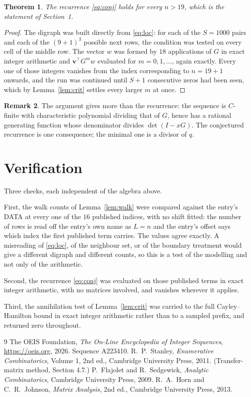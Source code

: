 \documentclass[11pt,a4paper]{article}
\theoremstyle{plain}
\newtheorem{theorem}{Theorem}
\theoremstyle{definition}
\newtheorem{remark}[theorem]{Remark}
\begin{document}
\begin{theorem}
The recurrence \eqref{eq:conj} holds for every $n>19$, which is the statement of
Section~1.
\end{theorem}

\begin{proof}
The digraph was built directly from \eqref{eq:loc}: for each of the $S=1000$ pairs and each
of the $(9+1)^{3}$ possible next rows, the condition was tested on every cell of
the middle row. The vector $w$ was formed by $18$ applications of $G$ in exact integer
arithmetic and $\mathbf{v}^{\!\top}G^{m}w$ evaluated for $m=0,1,\dots$, again exactly.
Every one of those integers vanishes from the index corresponding to $n=19+1$ onwards,
and the run was continued until $S+1$ consecutive zeros had been seen, which by
Lemma~\ref{lem:crit} settles every larger $m$ at once.
\end{proof}

\begin{remark}
The argument gives more than the recurrence: the sequence is $C$-finite with characteristic
polynomial dividing that of $G$, hence has a rational generating function whose denominator
divides $\det(I-xG)$. The conjectured recurrence is one consequence; the minimal one is a
divisor of $q$.
\end{remark}

\section{Verification}

Three checks, each independent of the algebra above.

First, the walk counts of Lemma~\ref{lem:walk} were compared against the entry's DATA at
every one of the $16$ published indices, with no shift fitted: the number of rows is
read off the entry's own name as $L=n$ and the entry's offset says which index the first
published term carries. The values agree exactly. A misreading of \eqref{eq:loc}, of the
neighbour set, or of the boundary treatment would give a different digraph and different
counts, so this is a test of the modelling and not only of the arithmetic.

Second, the recurrence \eqref{eq:conj} was evaluated on those published terms in exact
integer arithmetic, with no matrices involved, and vanishes wherever it applies.

Third, the annihilation test of Lemma~\ref{lem:crit} was carried to the full
Cayley--Hamilton bound in exact integer arithmetic rather than to a sampled prefix, and
returned zero throughout.

\begin{thebibliography}{9}
 The OEIS Foundation, \emph{The On-Line Encyclopedia of Integer
Sequences}, \url{https://oeis.org}, 2026. Sequence A223410.
 R.~P.~Stanley, \emph{Enumerative Combinatorics}, Volume 1, 2nd ed.,
Cambridge University Press, 2011. (Transfer-matrix method, Section 4.7.)
 P.~Flajolet and R.~Sedgewick, \emph{Analytic Combinatorics}, Cambridge
University Press, 2009.
 R.~A.~Horn and C.~R.~Johnson, \emph{Matrix Analysis}, 2nd ed., Cambridge
University Press, 2013.
\end{thebibliography}
\end{document}
